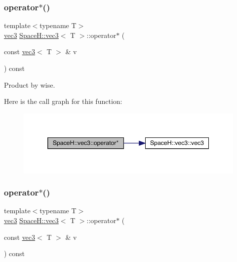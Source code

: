 \subsubsection{\texorpdfstring{operator$\ast$()}{operator*()}\hspace{0.1cm}{\footnotesize\ttfamily [3/7]}}
{\footnotesize\ttfamily template$<$typename T$>$ \\
\mbox{\hyperlink{struct_space_h_1_1vec3}{vec3}} \mbox{\hyperlink{struct_space_h_1_1vec3}{Space\+H\+::vec3}}$<$ T $>$\+::operator$\ast$ (\begin{DoxyParamCaption}\item[{const \mbox{\hyperlink{struct_space_h_1_1vec3}{vec3}}$<$ T $>$ \&}]{v }\end{DoxyParamCaption}) const\hspace{0.3cm}{\ttfamily [inline]}}



Product by wise. 

Here is the call graph for this function\+:
\nopagebreak
\begin{figure}[H]
\begin{center}
\leavevmode
\includegraphics[width=346pt]{struct_space_h_1_1vec3_a5399298171d5e12e7b76ade00ab7d67d_cgraph}
\end{center}
\end{figure}
\mbox{\label{struct_space_h_1_1vec3_a5399298171d5e12e7b76ade00ab7d67d}} 
\subsubsection{\texorpdfstring{operator$\ast$()}{operator*()}\hspace{0.1cm}{\footnotesize\ttfamily [4/7]}}
{\footnotesize\ttfamily template$<$typename T$>$ \\
\mbox{\hyperlink{struct_space_h_1_1vec3}{vec3}} \mbox{\hyperlink{struct_space_h_1_1vec3}{Space\+H\+::vec3}}$<$ T $>$\+::operator$\ast$ (\begin{DoxyParamCaption}\item[{const \mbox{\hyperlink{struct_space_h_1_1vec3}{vec3}}$<$ T $>$ \&}]{v }\end{DoxyParamCaption}) const\hspace{0.3cm}{\ttfamily [inline]}}



